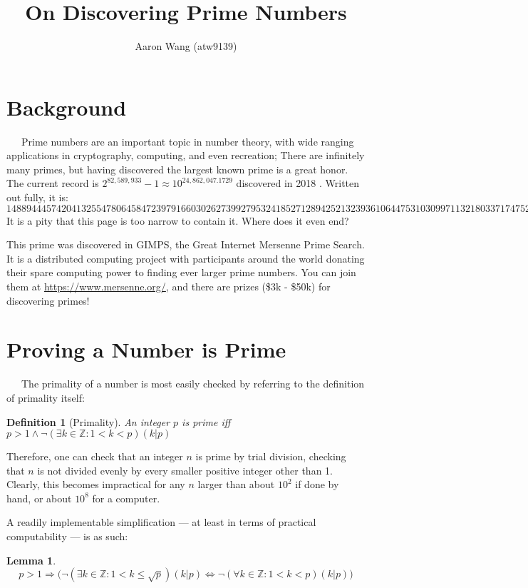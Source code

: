\documentclass[10pt, oneside]{article}
\title{On Discovering Prime Numbers}
\author{Aaron Wang (atw9139)}
\let\leq\leqslant
\newcommand{\Z}{\mathbb{Z}}
\newcommand{\entab}{\,\,\,\,\,\,\,\,\,}
\newtheorem{defn}{Definition}
\newtheorem{lem}{Lemma}
\begin{document}
\maketitle


\section{Background}

\entab Prime numbers are an important topic in number theory, with wide ranging applications in cryptography, computing, and even recreation; There are infinitely many primes, but having discovered the largest known prime is a great honor. The current record is $2^{82,589,933} - 1 \approx 10^{24,862,047.1729}$ discovered in 2018 \cite{press}. Written out fully, it is:
\[\!\!148894445742041325547806458472397916603026273992795324185271289425213239361064475310309971132180337174752834401423587560 hello, there!\]
It is a pity that this page is too narrow to contain it. Where does it even end?

This prime was discovered in GIMPS, the Great Internet Mersenne Prime Search. It is a distributed computing project with participants around the world donating their spare computing power to finding ever larger prime numbers. You can join them at \href{https://www.mersenne.org/}{https://www.mersenne.org/}, and there are prizes (\$3k - \$50k) for discovering primes!
    
    
\section{Proving a Number is Prime}

\entab The primality of a number is most easily checked by referring to the definition of primality itself:

\begin{defn}[Primality] An integer $p$ is prime iff $p > 1 \land \lnot(\exists k \in \Z: 1 < k < p)(k | p)$
\end{defn}

Therefore, one can check that an integer $n$ is prime by trial division, checking that $n$ is not divided evenly by every smaller positive integer other than 1. Clearly, this becomes impractical for any $n$ larger than about $10^2$ if done by hand, or about $10^8$ for a computer.

A readily implementable simplification — at least in terms of practical computability — is as such:

\begin{lem}
    \[p > 1 \Rightarrow \big(\lnot(\exists k \in \Z: 1 < k \leq \sqrt{p})(k | p) \Leftrightarrow \lnot(\forall k \in \Z: 1 < k < p)(k | p)\big)\]
\end{lem}
\end{document}
